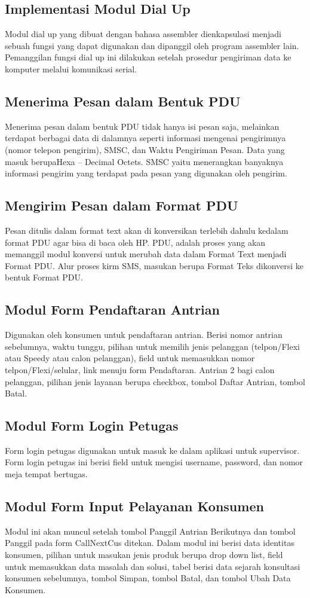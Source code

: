 \subsection{Implementasi Modul Dial Up}
Modul dial up yang dibuat dengan bahasa assembler dienkapsulasi menjadi sebuah fungsi yang dapat digunakan dan dipanggil oleh program assembler lain. Pemanggilan fungsi dial up ini dilakukan setelah prosedur pengiriman data ke komputer melalui komunikasi serial.
\subsection{Menerima Pesan dalam Bentuk PDU}
Menerima pesan dalam bentuk PDU tidak hanya isi pesan saja, melainkan terdapat berbagai data di dalamnya seperti informasi mengenai pengirimnya (nomor telepon pengirim), SMSC, dan Waktu Pengiriman Pesan. Data yang masuk berupaHexa – Decimal Octets. SMSC yaitu menerangkan banyaknya informasi pengirim yang terdapat pada pesan yang digunakan oleh pengirim.
\subsection{Mengirim Pesan dalam Format PDU}
Pesan ditulis dalam format text akan di konversikan terlebih dahulu kedalam format PDU agar bisa di baca oleh HP. PDU, adalah proses yang akan memanggil modul konversi untuk merubah data dalam Format Text menjadi Format PDU.  Alur proses kirm SMS, masukan berupa Format Teks dikonversi ke bentuk Format PDU.
\subsection{Modul Form Pendaftaran Antrian}
Digunakan oleh konsumen untuk pendaftaran antrian. Berisi nomor antrian sebelumnya, waktu tunggu, pilihan untuk memilih jenis pelanggan (telpon/Flexi atau Speedy atau calon pelanggan), field untuk memasukkan nomor telpon/Flexi/selular, link menuju form Pendaftaran. Antrian 2 bagi calon pelanggan, pilihan jenis layanan berupa checkbox, tombol Daftar Antrian, tombol Batal.
\subsection{Modul Form Login Petugas}
Form login petugas digunakan untuk masuk ke dalam aplikasi untuk supervisor. Form login petugas ini berisi
field untuk mengisi username, password, dan nomor meja tempat bertugas. 
\subsection{Modul Form Input Pelayanan Konsumen}
Modul ini akan muncul setelah tombol Panggil Antrian Berikutnya dan tombol Panggil pada form CallNextCus ditekan. 
Dalam modul ini berisi data identitas konsumen, pilihan untuk masukan jenis produk berupa drop down list,
field untuk memasukkan data masalah dan solusi, tabel berisi data sejarah konsultasi konsumen sebelumnya, tombol Simpan, tombol
Batal, dan tombol Ubah Data Konsumen. 

